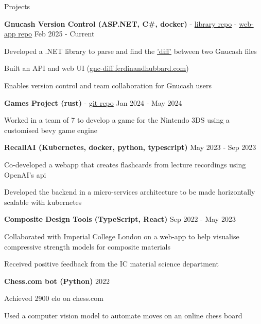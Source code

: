 \documentclass{resume} %
\let\olditemize\itemize
\let\endolditemize\enditemize
\renewenvironment{itemize}{
  \vspace*{-6pt} %
  \olditemize
  \setlength{\itemsep}{0pt}
  \setlength{\topsep}{0pt}         %
  \setlength{\partopsep}{0pt}      %
  \setlength{\parsep}{0pt}         %
  \setlength{\parskip}{0pt}        %
  \setlength{\leftmargin}{1em}
}{
  \endolditemize
  \vspace*{-6pt} %
}
\begin{document}
\begin{rSection}{Projects}

\textbf{Gnucash Version Control (ASP.NET, C\#, docker)} - \href{https://github.com/ferdinandhubbard981/gnucash-diff}{library repo} - \href{https://github.com/ferdinandhubbard981/gnucash-version-control-web}{web-app repo} \hfill Feb 2025 - Current
\begin{itemize}
    \item Developed a .NET library to parse and find the \href{https://en.wikipedia.org/wiki/Diff}{'diff'} between two Gnucash files
    \item Built an API and web UI (\href{https://gnc-diff.ferdinandhubbard.com}{gnc-diff.ferdinandhubbard.com})
    \item Enables version control and team collaboration for Gnucash users
\end{itemize}

\textbf{Games Project (rust)} - \href{https://github.com/Team-Yarg/these\_times\_of\_mine}{git repo} \hfill Jan 2024 - May 2024
\begin{itemize}
    \item Worked in a team of 7 to develop a game for the Nintendo 3DS using a customised bevy game engine
\end{itemize}

\textbf{RecallAI (Kubernetes, docker, python, typescript)} \hfill May 2023 - Sep 2023
\begin{itemize}
    \item Co-developed a webapp that creates flashcards from  lecture recordings using OpenAI's api
    \item Developed the backend in a micro-services architecture to be made horizontally scalable with kubernetes
\end{itemize}

\textbf{Composite Design Tools (TypeScript, React)} \hfill Sep 2022 - May 2023
\begin{itemize}
    \item Collaborated with Imperial College London on a web-app to help visualise compressive strength models for composite materials
    \item Received positive feedback from the IC material science department
\end{itemize}

\textbf{Chess.com bot (Python)} \hfill 2022
\begin{itemize}
    \item Achieved 2900 elo on chess.com
    \item Used a computer vision model to automate moves on an online chess board
\end{itemize}


\end{rSection}
\end{document}
